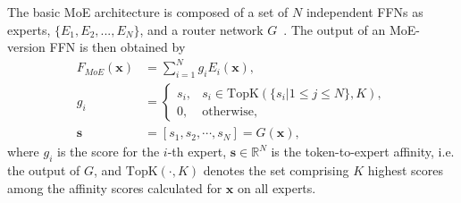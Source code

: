 The basic MoE architecture is composed of a set of $N$ independent FFNs as experts, $\{E_1, E_2, . . . , E_N \}$, and a router network $G$~\cite{lepikhin2020gshard}.
The output of an MoE-version FFN is then obtained by
\begin{equation}\label{eq:router_basic}
\begin{aligned}
    \!\!\!\!F_{MoE}(\mathbf{x}) \!&=\! \sum^{N}_{i=1} g_i E_i(\textbf{x}), \\
    g_i \!&=\! \left\{ \begin{array}{rl}
        s_i, \!&s_i \in \text{TopK}(\{s_i | 1\leq j\leq N\}, K),  \\ 
        0, \!& \text{otherwise},
    \end{array}\right. \\
    \textbf{s} \!&=\! \left[s_1,s_2,\cdots, s_N\right] = G(\textbf{x}),
\end{aligned}
\end{equation}
where $g_i$ is the score for the $i$-th expert, $\textbf{s} \in \mathbb{R}^{N}$ is the token-to-expert affinity, i.e. the output of $G$, and $\text{TopK}(\cdot, K )$ denotes the set comprising $K$ highest scores among the affinity scores calculated for $\mathbf{x}$ on all experts.


